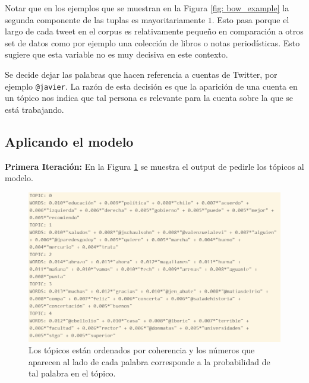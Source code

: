 \documentclass{article}
\begin{document}
	\begin{remark}
		Notar que en los ejemplos que se muestran en la Figura \ref{fig: bow_example} la segunda componente de las tuplas es mayoritariamente $1$. Esto pasa porque el largo de cada tweet en el corpus es relativamente pequeño en comparación a otros set de datos como por ejemplo una colección de libros o notas periodísticas. Esto sugiere que esta variable no es muy decisiva en este contexto. 
	\end{remark}

	\begin{remark}
		Se decide dejar las palabras que hacen referencia a cuentas de Twitter, por ejemplo \texttt{@javier}. La razón de esta decisión es que la aparición de una cuenta en un tópico nos indica que tal persona es relevante para la cuenta sobre la que se está trabajando.
	\end{remark}

	\subsection{Aplicando el modelo}
	
	\textbf{Primera Iteración:} En la Figura \ref{fig: boric0_informe} se muestra el output de pedirle los tópicos al modelo.    
	
		\begin{figure}[H]
		\centering
		\includegraphics[scale=.5]{../imgs/boric0_informe.png}
		\caption{Los tópicos están ordenados por coherencia y los números que aparecen al lado de cada palabra corresponde a la probabilidad de tal palabra en el tópico.}
		\label{fig: boric0_informe}
	\end{figure}
%
\end{document}
